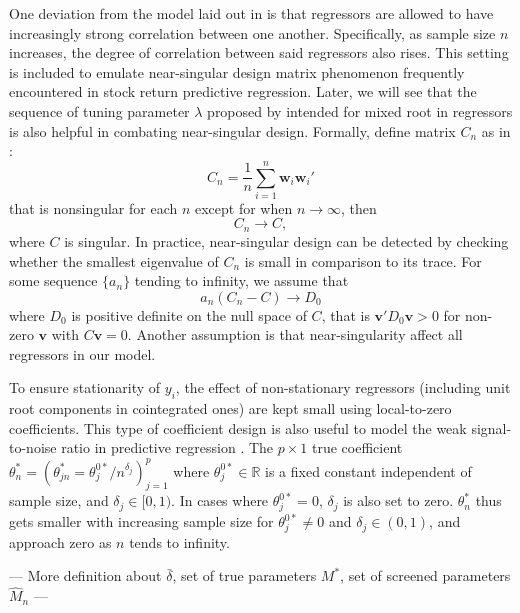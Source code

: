 \documentclass[12pt,a4paper]{article}
\begin{document}
One deviation from the model laid out in \cite{lee2018lasso} is that regressors are allowed to have increasingly strong correlation between one another. Specifically, as sample size $ n $ increases, the degree of correlation between said regressors also rises. This setting is included to emulate near-singular design matrix phenomenon frequently encountered in stock return predictive regression. Later, we will see that the sequence of tuning parameter $ \lambda $ proposed by \cite{lee2018lasso} intended for mixed root in regressors is also helpful in combating near-singular design. Formally, define matrix $ C_n $ as in \cite{knight2008shrinkage}:
\begin{equation}\label{eq:2}
	C_n = \frac{1}{n}\sum_{i = 1}^{n}\bm{w}_i \bm{w}_i'
\end{equation}
that is nonsingular for each $ n $ except for when $ n \rightarrow \infty $, then 
\begin{equation}\label{eq:3}
	C_n \rightarrow C,
\end{equation}
where $ C $ is singular. In practice, near-singular design can be detected by checking whether the smallest eigenvalue of $ C_n $ is small in comparison to its trace. 
For some sequence $ \{a_n\}$ tending to infinity, we assume that
\begin{equation}\label{eq:4}
	a_n(C_n - C) \rightarrow D_0
\end{equation}
where $ D_0 $ is positive definite on the null space of $ C $, that is $ \bm{v}'D_0\bm{v} > 0 $ for non-zero $ \bm{v} $ with $ C\bm{v} = 0 $.
Another assumption is that near-singularity affect all regressors in our model.

To ensure stationarity of $ y_i $, the effect of non-stationary regressors (including unit root components in cointegrated ones) are kept small using local-to-zero coefficients. This type of coefficient design is also useful to model the weak signal-to-noise ratio in predictive regression \citep{phillips2013predictive, lee2018lasso}. The $ p \times 1$ true coefficient $ \theta^*_n = (\theta^*_{jn} = \theta^{0*}_j/n^{\delta_j})^p_{j = 1} $ where $ \theta^{0*}_j \in \mathbb{R} $ is a fixed constant independent of sample size, and $ \delta_j \in [0, 1) $. In cases where $ \theta^{0*}_j = 0 $,  $ \delta_j $ is also set to zero. $ \theta^*_n $ thus gets smaller with increasing sample size for $ \theta^{0*}_j \neq 0 $ and $ \delta_j \in (0, 1) $, and approach zero as $ n $ tends to infinity.

--- More definition about $ \bar{\delta} $, set of true parameters $ M^* $, set of screened parameters $ \hat{M}_n $ ---
\end{document}
